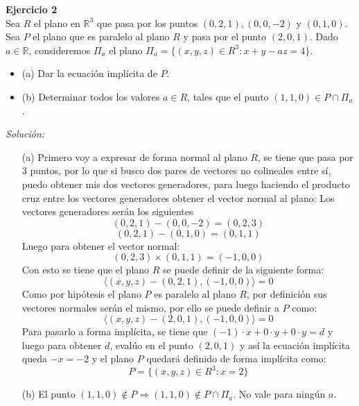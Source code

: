 \documentclass{article}
\newenvironment{problem}[2][Ejercicio]
    { \begin{mdframed}[backgroundcolor=gray!20] \textbf{#1 #2} \\}
    {  \end{mdframed}}
\newenvironment{solution}
    {\textit{Solución:}}
    {}
\begin{document}
\begin{problem}{2}
    Sea $R$ el plano en $\mathbb{R}^3$ que pasa por los puntos $(0,2,1), (0,0,-2)$ y $(0,1,0)$. Sea $P$ el plano que es paralelo al plano $R$ y pasa por el punto $(2,0,1)$. Dado $a\in \mathbb{R}$, consideremos $\Pi_a$ el plano \newline $\Pi_a = \{ (x,y,z)\in R^3 : x+y-az = 4 \}.$
\begin{itemize}
\item 
(a) Dar la ecuación implícita de $P$.
\item 
(b) Determinar todos los valores $a\in R$, tales que el punto $(1,1,0) \in P \cap \Pi_a$.
\end{itemize}
\end{problem}
\begin{solution}
    \begin{itemize}
        \item[(a)] Primero voy a expresar de forma normal al plano $R$, se tiene que pasa por 3 puntos, por lo que si busco dos pares de vectores no colineales entre sí, puedo obtener mis dos vectores generadores, para luego haciendo el producto cruz entre los vectores generadores obtener el vector normal al plano:
        Los vectores generadores serán los siguientes
        \[
        (0,2,1)-(0,0,-2) = (0,2,3)
        \]\[
        (0,2,1)-(0,1,0) = (0,1,1)
        \]
        Luego para obtener el vector normal:
        \[
        (0,2,3)\times (0,1,1) = (-1,0,0)
        \]
        Con esto se tiene que el plano $R$ se puede definir de la siguiente forma:
        \[
        \langle (x,y,z) - (0,2,1), (-1,0,0)\rangle = 0
        \]
        Como por hipótesis el plano $P$ es paralelo al plano $R$, por definición sus vectores normales serán el mismo, por ello se puede definir a $P$ como:
        \[
        \langle (x,y,z) - (2,0,1), (-1,0,0)\rangle = 0
        \]
        Para pasarlo a forma implícita, se tiene que $(-1)\cdot x + 0 \cdot y + 0 \cdot y = d$ y luego para obtener $d$, evalúo en el punto $(2,0,1)$ y así la ecuación implícita queda $-x=-2$ y el plano $P$ quedará definido de forma implícita como:
        \[
        P = \{ (x,y,z) \in R^3 : x = 2 \}
        \]
        \item[(b)] El punto $(1,1,0) \notin P \Rightarrow (1,1,0) \notin P \cap \Pi_a$. No vale para ningún $a$.
    \end{itemize}
\end{solution}

\end{document}
